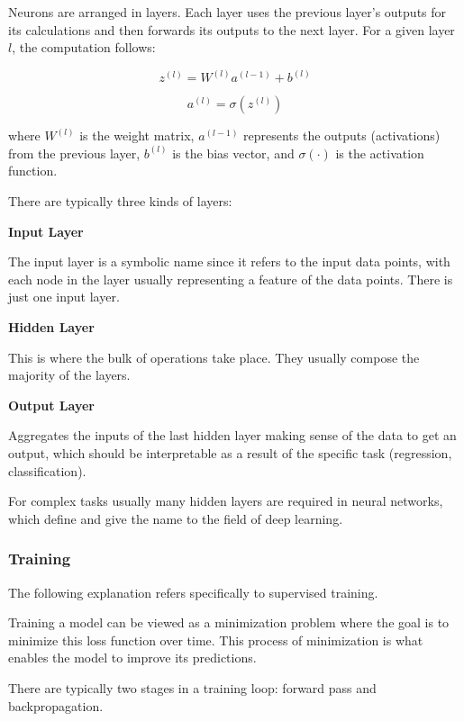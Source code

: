 Neurons are arranged in layers. Each layer uses the previous layer's outputs for its calculations and then forwards its outputs to the next layer.  For a given layer \( l \), the computation follows:

\begin{equation}
    z^{(l)} = W^{(l)} a^{(l-1)} + b^{(l)}
\end{equation}

\begin{equation}
    a^{(l)} = \sigma(z^{(l)})
\end{equation}

where \( W^{(l)} \) is the weight matrix, \( a^{(l-1)} \) represents the outputs (activations) from the previous layer, \( b^{(l)} \) is the bias vector, and \( \sigma(\cdot) \) is the activation function. 

There are typically three kinds of layers:

\textbf{Input Layer}

The input layer is a symbolic name since it refers to the input data points, with each node in the layer usually representing a feature of the data points. There is just one input layer.

\textbf{Hidden Layer} 

This is where the bulk of operations take place. They usually compose the majority of the layers.

\textbf{Output Layer}

Aggregates the inputs of the last hidden layer making sense of the data to get an output, which should be interpretable as a result of the specific task (regression, classification).


For complex tasks usually many hidden layers are required in neural networks, which define and give the name to the field of deep learning.

\subsubsection{Training}

The following explanation refers specifically to supervised training.

Training a model can be viewed as a minimization problem where the goal is to minimize this loss function over time. This process of minimization is what enables the model to improve its predictions.

There are typically two stages in a training loop: forward pass and backpropagation.

